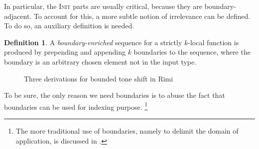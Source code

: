 \documentclass[11pt]{article}
\theoremstyle{definition}
\newtheorem{definition}{Definition}
\theoremstyle{plain}
\begin{document}
In particular, the \textsc{Init} parts are usually critical, because
they are boundary-adjacent.  To account for this, a more subtle notion
of irrelevance can be defined.  To do so, an auxiliary definition is
needed.

\begin{definition}
  A \emph{boundary-enriched} sequence for a strictly \(k\)-local
  function is produced by prepending and appending \(k\) boundaries to
  the sequence, where the boundary is an arbitrary chosen element not
  in the input type.
\end{definition}

\begin{figure*}
  \centering
  \begin{center}
    \begin{prooftree}
    \end{prooftree}
  \end{center}

  \begin{multicols}{2}
    \begin{prooftree}
    \end{prooftree}

    \begin{prooftree}
    \end{prooftree}
  \end{multicols}

  \caption{Three derivations for bounded tone shift in Rimi}
  \label{fig:deriv-rimi}
\end{figure*}

To be sure, the only reason we need boundaries is to abuse the fact
that boundaries can be used for indexing purpose.%
\footnote{The more traditional use of boundaries, namely to delimit
  the domain of application, is discussed in \citet{c23sctscscl}.}
\end{document}
